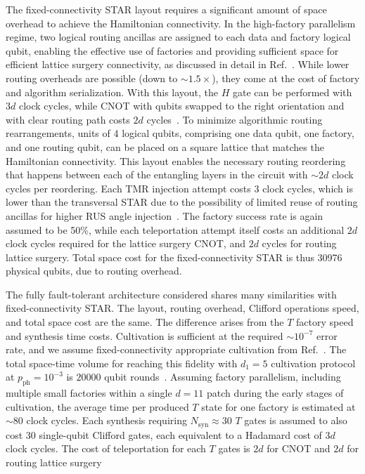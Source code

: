 \documentclass[aps, prx, reprint, superscriptaddress, longbibliography, floatfix]{revtex4-2}
\begin{document}
The fixed-connectivity STAR layout requires a significant amount of space overhead to achieve the Hamiltonian connectivity. In the high-factory parallelism regime, two logical routing ancillas are assigned to each data and factory logical qubit, enabling the effective use of factories and providing sufficient space for efficient lattice surgery connectivity, as discussed in detail in Ref.~\cite{Akahoshi2024}. While lower routing overheads are possible (down to $\sim 1.5\times$), they come at the cost of factory and algorithm serialization. With this layout, the $H$ gate can be performed with $3d$ clock cycles, while CNOT with qubits swapped to the right orientation and with clear routing path costs $2d$ cycles~\cite{Akahoshi2024}. To minimize algorithmic routing rearrangements, units of 4 logical qubits, comprising one data qubit, one factory, and one routing qubit, can be placed on a square lattice that matches the Hamiltonian connectivity. This layout enables the necessary routing reordering that happens between each of the entangling layers in the circuit with $\sim 2d$ clock cycles per reordering. Each TMR injection attempt costs 3 clock cycles, which is lower than the transversal STAR due to the possibility of limited reuse of routing ancillas for higher RUS angle injection~\cite{Akahoshi2024}. The factory success rate is again assumed to be 50\%, while each teleportation attempt itself costs an additional $2d$ clock cycles required for the lattice surgery CNOT, and $2d$ cycles for routing lattice surgery.  Total space cost for the fixed-connectivity STAR is thus 30976 physical qubits, due to routing overhead.

The fully fault-tolerant architecture considered shares many similarities with fixed-connectivity STAR. The layout, routing overhead, Clifford operations speed, and total space cost are the same. The difference arises from the $T$ factory speed and synthesis time costs. Cultivation is sufficient at the required $\sim 10^{-7}$ error rate, and we assume fixed-connectivity appropriate cultivation from Ref.~\cite{Gidney2024}. The total space-time volume for reaching this fidelity with $d_1=5$ cultivation protocol at $p_{\mathrm{ph}}=10^{-3}$ is $20000$ qubit rounds~\cite{Gidney2024}. Assuming factory parallelism, including multiple small factories within a single $d=11$ patch during the early stages of cultivation, the average time per produced $T$ state for one factory is estimated at $\sim 80$ clock cycles. Each synthesis requiring $N_{\mathrm{syn}}\approx 30$ $T$ gates is assumed to also cost 30 single-qubit Clifford gates, each equivalent to a Hadamard cost of $3d$ clock cycles. The cost of teleportation for each $T$ gates is $2d$ for CNOT and $2d$ for routing lattice surgery
\end{document}
